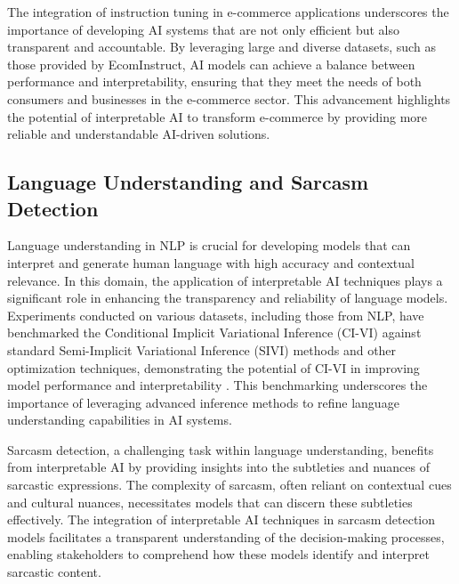 The integration of instruction tuning in e-commerce applications underscores the importance of developing AI systems that are not only efficient but also transparent and accountable. By leveraging large and diverse datasets, such as those provided by EcomInstruct, AI models can achieve a balance between performance and interpretability, ensuring that they meet the needs of both consumers and businesses in the e-commerce sector. This advancement highlights the potential of interpretable AI to transform e-commerce by providing more reliable and understandable AI-driven solutions.



\subsection{Language Understanding and Sarcasm Detection} \label{subsec:Language Understanding and Sarcasm Detection}



Language understanding in NLP is crucial for developing models that can interpret and generate human language with high accuracy and contextual relevance. In this domain, the application of interpretable AI techniques plays a significant role in enhancing the transparency and reliability of language models. Experiments conducted on various datasets, including those from NLP, have benchmarked the Conditional Implicit Variational Inference (CI-VI) against standard Semi-Implicit Variational Inference (SIVI) methods and other optimization techniques, demonstrating the potential of CI-VI in improving model performance and interpretability \cite{moens2021efficientsemiimplicitvariationalinference}. This benchmarking underscores the importance of leveraging advanced inference methods to refine language understanding capabilities in AI systems.



Sarcasm detection, a challenging task within language understanding, benefits from interpretable AI by providing insights into the subtleties and nuances of sarcastic expressions. The complexity of sarcasm, often reliant on contextual cues and cultural nuances, necessitates models that can discern these subtleties effectively. The integration of interpretable AI techniques in sarcasm detection models facilitates a transparent understanding of the decision-making processes, enabling stakeholders to comprehend how these models identify and interpret sarcastic content.



